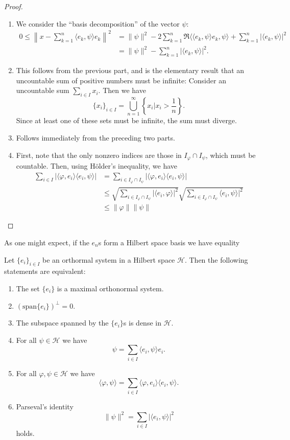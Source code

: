 \documentclass[twoside,symmetric, openany, 12pt]{./tuftebook}
\theoremstyle{definition}
\theoremstyle{definition}
\theoremstyle{definition}
\newenvironment{parts}{\begin{enumerate}[label=(\alph*)]}{\end{enumerate}}
\begin{document}
\begin{proof}
	\begin{parts}
	\item 	We consider the ``basis decomposition'' of the vector $\psi$:
	\begin{align*}
		0\le \left\|x - \sum_{k=1}^n \langle e_k, \psi\rangle e_k\right\|^2 &=  \|\psi\|^2 - 2\sum_{k=1}^n \Re \langle\langle e_k, \psi\rangle e_k, \psi\rangle + \sum_{k=1}^n |\langle e_k, \psi\rangle|^2\\
		&= \|\psi\|^2 - \sum_{k=1}^n |\langle e_k, \psi\rangle|^2.
	\end{align*}
\item This follows from the previous part, and is the elementary result that an uncountable sum of positive numbers must be infinite: Consider an uncountable sum $\sum_{i\in I}x_i$. Then we have
\[\{x_i\}_{i\in I}= \bigcup_{n=1}^\infty \left\{x_i | x_i > \frac 1n\right\}.\]
Since at least one of these sets must be infinite, the sum must diverge.
\item Follows immediately from the preceding two parts.
\item First, note that the only nonzero indices are those in $I_\varphi \cap I_\psi$, which must be countable. Then, using Hölder's inequality, we have
\begin{align*}
	\sum_{i\in I}|\langle \varphi, e_i\rangle \langle e_i, \psi\rangle| &= \sum_{i\in I_\varphi \cap I_\psi}|\langle \varphi, e_i\rangle \langle e_i, \psi\rangle|\\
	&\le \sqrt{\sum_{i\in I_\varphi \cap I_\psi}|\langle e_i, \varphi\rangle|^2}\sqrt{\sum_{i\in I_\varphi \cap I_\psi}\langle e_i, \psi\rangle|^2}\\
	&\le \|\varphi\| \|\psi\|
\end{align*}
	\end{parts}
\end{proof}
As one might expect, if the $e_n$s form a Hilbert space basis we have equality
\begin{Theorem}
	Let $\{e_i\}_{i\in I}$ be an orthormal system in a Hilbert space $\mathcal{H}$. Then the following statements are equivalent:
	\begin{parts}
	\item The set $\{e_i\} $ is a maximal orthonormal system. 
	\item $(\text{span}\{e_i\})^\perp = 0$.
	\item The subspace spanned by the $\{e_i\} $s is dense in $\mathcal{H}$.
	\item For all $\psi\in \mathcal{H}$ we have
		\[
			\psi = \sum_{i\in I}\langle e_i, \psi\rangle e_i
		.\] 
	\item For all $\varphi, \psi\in \mathcal{H}$ we have
		\[
		\langle \varphi, \psi\rangle = \sum_{i\in I}\langle \varphi, e_i\rangle \langle e_i, \psi\rangle
		.\] 
	\item Parseval's identity
		\[
			\|\psi\|^2 = \sum_{i\in I}|\langle e_i, \psi\rangle|^2
		\]
		holds.
	\end{parts}
\end{Theorem}
\end{document}
